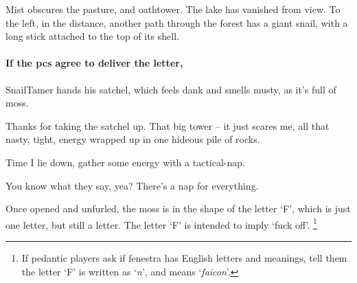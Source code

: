 \begin{boxtext}
  Mist obscures the pasture, and \gls{oathtower}.
  The lake has vanished from view.
  To the left, in the distance, another path through the forest has a giant snail, with a long stick attached to the top of its shell.
\end{boxtext}

\paragraph{If the \glspl{pc} agree to deliver the letter,}
\gls{SnailTamer} hands his satchel, which feels dank and smells musty, as it's full of moss.

\begin{speechtext}
  Thanks for taking the satchel up.
  That big tower -- it just scares me, all that nasty, tight, energy wrapped up in one hideous pile of rocks.

  Time I lie down, gather some energy with a tactical-nap.

  You know what they say, yea?
  There's a nap for everything.
\end{speechtext}

Once opened and unfurled, the moss is in the shape of the letter `F', which is just one letter, but still a letter.
The letter `F' is intended to imply `fuck off'.%
\footnote{If pedantic players ask if \gls{fenestra} has English letters and meanings, tell them the letter `F' is written as `\emph{n}', and means `\textit{faicon}'.}


